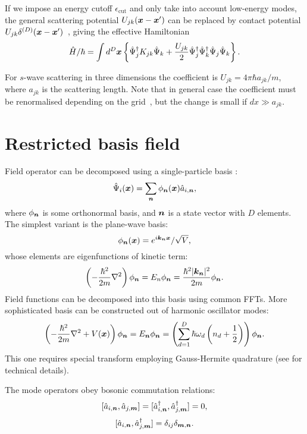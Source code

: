 If we impose an energy cutoff $\epsilon_{\mathrm{cut}}$ and only take into account low-energy modes,
the general scattering potential $U_{jk}(\boldsymbol{x} - \boldsymbol{x}^\prime)$ can be replaced by contact potential $U_{jk} \delta^{(D)}(\boldsymbol{x} - \boldsymbol{x}^\prime)$~\cite{Morgan2000}, giving the effective Hamiltonian
\begin{equation}
\label{eqn:wigner:hamiltonian_effective}
\begin{split}
	\hat{H} / \hbar = \int d^{D}\boldsymbol{x} \left\{
		\hat{\Psi}_j^{\dagger} K_{jk} \hat{\Psi}_k
		+ \frac{U_{jk}}{2} \hat{\Psi}_j^\dagger \hat{\Psi}_k^\dagger \hat{\Psi}_j \hat{\Psi}_k
	\right\}.
\end{split}
\end{equation}

For $s$-wave scattering in three dimensions the coefficient is $U_{jk} = 4 \pi \hbar a_{jk} / m$,
where $a_{jk}$ is the scattering length.
Note that in general case the coefficient must be renormalised depending on the grid~\cite{Sinatra2002},
but the change is small if $dx \gg a_{jk}$.

\section{Restricted basis field}

Field operator can be decomposed using a single-particle basis :
\[
	\hat{\Psi}_i(\boldsymbol{x}) = \sum\limits_{\boldsymbol{n}} \phi_{\boldsymbol{n}}(\boldsymbol{x}) \hat{a}_{i,\boldsymbol{n}},
\]
where $\phi_{\boldsymbol{n}}$ is some orthonormal basis,
and $\boldsymbol{n}$ is a state vector with $D$ elements.
The simplest variant is the plane-wave basis:
\[
	\phi_{\boldsymbol{n}}(\boldsymbol{x}) = e^{i \boldsymbol{k}_{\boldsymbol{n}} \boldsymbol{x}} / \sqrt{V},
\]
whose elements are eigenfunctions of kinetic term:
\[
	\left( -\frac{\hbar^2}{2m} \nabla^2 \right) \phi_{\boldsymbol{n}}
	= E_n \phi_{\boldsymbol{n}}
	= \frac{\hbar^2 \lvert \boldsymbol{k}_{\boldsymbol{n}} \rvert^2}{2 m} \phi_{\boldsymbol{n}}.
\]
Field functions can be decomposed into this basis using common FFTs.
More sophisticated basis can be constructed out of harmonic oscillator modes:
\[
	\left( -\frac{\hbar^2}{2m} \nabla^2 + V(\boldsymbol{x}) \right) \phi_{\boldsymbol{n}}
	= E_{\boldsymbol{n}} \phi_{\boldsymbol{n}}
	= \left(
		\sum\limits_{d=1}^D \hbar \omega_d \left(
			n_d + \frac{1}{2}
		\right)
	\right) \phi_{\boldsymbol{n}}.
\]
This one requires special transform employing Gauss-Hermite quadrature
(see  for technical details).

The mode operators obey bosonic commutation relations:
\[
	[ \hat{a}_{i,\boldsymbol{n}}, \hat{a}_{j,\boldsymbol{m}} ]
	= [ \hat{a}_{i,\boldsymbol{n}}^\dagger, \hat{a}_{j,\boldsymbol{m}}^\dagger ] = 0,
\]
\[
	[ \hat{a}_{i,\boldsymbol{n}}, \hat{a}_{j,\boldsymbol{m}}^\dagger ]
	= \delta_{ij} \delta_{\boldsymbol{m},\boldsymbol{n}}.
\]

